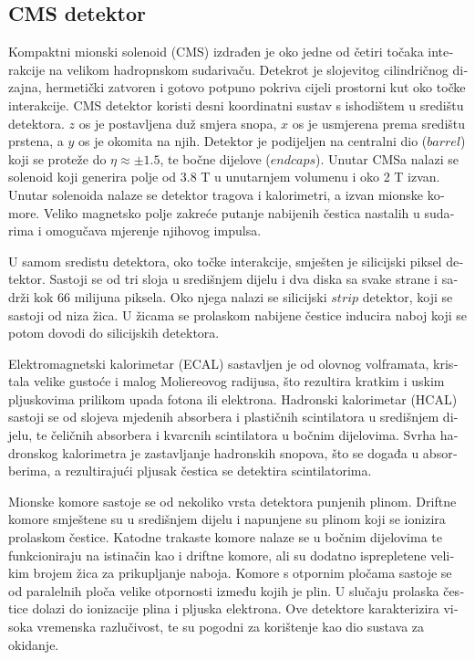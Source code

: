 \begin{otherlanguage}{croatian}
 
\section{CMS detektor}
Kompaktni mionski solenoid (CMS) izdrađen je oko jedne od četiri točaka interakcije na velikom hadropnskom sudarivaču. Detekrot je slojevitog cilindričnog dizajna, hermetički zatvoren i gotovo potpuno pokriva cijeli prostorni kut oko točke interakcije. CMS detektor koristi desni koordinatni sustav s ishodištem u središtu detektora. $z$ os je postavljena duž smjera snopa, $x$ os je usmjerena prema središtu prstena, a $y$ os je okomita na njih. Detektor je podijeljen na centralni dio ($barrel$) koji se proteže do $\eta \approx \pm 1.5$, te bočne dijelove ($endcaps$). Unutar CMSa nalazi se solenoid koji generira polje od 3.8 T u unutarnjem volumenu i oko 2 T izvan.  Unutar solenoida nalaze se detektor tragova i kalorimetri, a izvan mionske komore. Veliko magnetsko polje zakreće putanje nabijenih čestica nastalih u sudarima i omogučava mjerenje njihovog impulsa. 
\par U samom sredistu detektora, oko točke interakcije, smješten je silicijski piksel detektor. Sastoji se od tri sloja u središnjem dijelu i dva diska sa svake strane i sadrži kok 66 milijuna piksela. Oko njega nalazi se silicijski $strip$ detektor, koji se sastoji od niza žica. U žicama se prolaskom nabijene čestice inducira naboj koji se potom dovodi do silicijskih detektora. 
\par Elektromagnetski kalorimetar (ECAL) sastavljen je od olovnog volframata, kristala velike gustoće i malog Moliereovog radijusa, što rezultira kratkim i uskim pljuskovima prilikom upada fotona ili elektrona. Hadronski kalorimetar (HCAL) sastoji se od slojeva mjedenih absorbera i plastičnih scintilatora u središnjem dijelu, te čeličnih absorbera i kvarcnih scintilatora u bočnim dijelovima. Svrha hadronskog kalorimetra je zastavljanje hadronskih snopova, što se događa u absorberima, a rezultirajući pljusak čestica se detektira scintilatorima. 
\par Mionske komore sastoje se od nekoliko vrsta detektora punjenih plinom. Driftne komore smještene su u središnjem dijelu i napunjene su plinom koji se ionizira prolaskom čestice. Katodne trakaste komore nalaze se u bočnim dijelovima te funkcioniraju na istinačin kao i driftne komore, ali su dodatno isprepletene velikim brojem žica za prikupljanje naboja. Komore s otpornim pločama sastoje se od paralelnih ploča velike otpornosti između kojih je plin. U slučaju prolaska čestice dolazi do ionizacije plina i pljuska elektrona. Ove detektore karakterizira visoka vremenska razlučivost, te su pogodni za korištenje kao dio sustava za okidanje. 

\end{otherlanguage}
